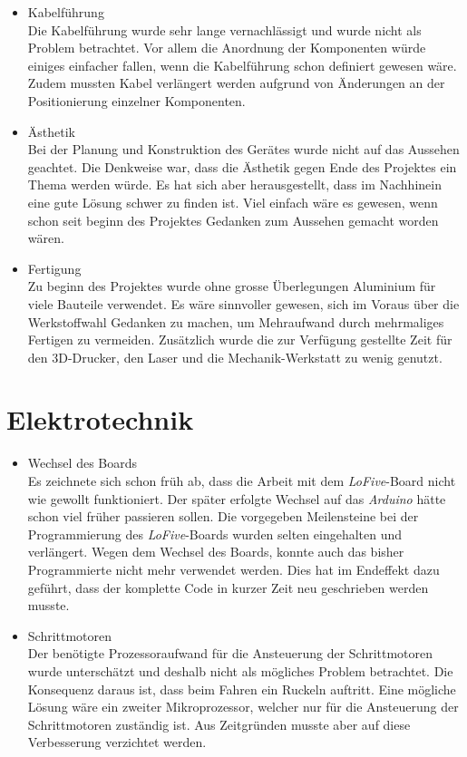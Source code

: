 \documentclass[a4paper]{report}
\begin{document}
\begin{itemize}
	\item Kabelführung\\
	Die Kabelführung wurde sehr lange vernachlässigt und wurde nicht als Problem betrachtet. Vor allem die Anordnung der Komponenten würde einiges einfacher fallen, wenn die Kabelführung schon definiert gewesen wäre. Zudem mussten Kabel verlängert werden aufgrund von Änderungen an der Positionierung einzelner Komponenten.
	\item Ästhetik\\
	Bei der Planung und Konstruktion des Gerätes wurde nicht auf das Aussehen geachtet. Die Denkweise war, dass die Ästhetik gegen Ende des Projektes ein Thema werden würde. Es hat sich aber herausgestellt, dass im Nachhinein eine gute Lösung schwer zu finden ist. Viel einfach wäre es gewesen, wenn schon seit beginn des Projektes Gedanken zum Aussehen gemacht worden wären.
	\item Fertigung\\
	Zu beginn des Projektes wurde ohne grosse Überlegungen Aluminium für viele Bauteile verwendet. Es wäre sinnvoller gewesen, sich im Voraus über die Werkstoffwahl Gedanken zu machen, um Mehraufwand durch mehrmaliges Fertigen zu vermeiden. Zusätzlich wurde die zur Verfügung gestellte Zeit für den 3D-Drucker, den Laser und die Mechanik-Werkstatt zu wenig genutzt.
\end{itemize}

\section{Elektrotechnik}
\begin{itemize}
	\item Wechsel des Boards\\
	Es zeichnete sich schon früh ab, dass die Arbeit mit dem \textit{LoFive}-Board nicht wie gewollt funktioniert. Der später erfolgte Wechsel auf das \textit{Arduino} hätte schon viel früher passieren sollen. Die vorgegeben Meilensteine bei der Programmierung des \textit{LoFive}-Boards wurden selten eingehalten und verlängert. Wegen dem Wechsel des Boards, konnte auch das bisher Programmierte nicht mehr verwendet werden. Dies hat im Endeffekt dazu geführt, dass der komplette Code in kurzer Zeit neu geschrieben werden musste.
	\item Schrittmotoren\\
	Der benötigte Prozessoraufwand für die Ansteuerung der Schrittmotoren wurde unterschätzt und deshalb nicht als mögliches Problem betrachtet. Die Konsequenz daraus ist, dass beim Fahren ein Ruckeln auftritt. Eine mögliche Lösung wäre ein zweiter Mikroprozessor, welcher nur für die Ansteuerung der Schrittmotoren zuständig ist. Aus Zeitgründen musste aber auf diese Verbesserung verzichtet werden.
\end{itemize}
\end{document}
